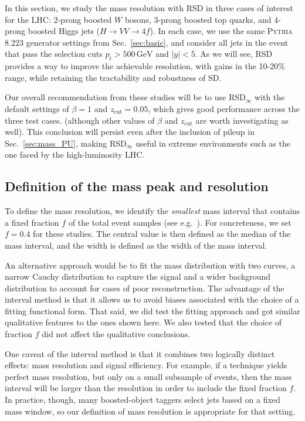 \documentclass[11pt,a4paper]{article}
\newcommand{\zcut}{z_\text{cut}}
\newcommand{\GeV}{\,\mathrm{GeV}}
\DeclareRobustCommand{\Sec}[1]{Sec.~\ref{#1}}
\begin{document}
In this section, we study the mass resolution with RSD in three cases
of interest for the LHC: 2-prong boosted $W$ bosons, 3-prong boosted
top quarks, and 4-prong boosted Higgs jets ($H\to VV\to 4f$).
%
In each case, we use the same \textsc{Pythia} 8.223 generator settings
from \Sec{sec:basic}, and consider all jets in the event
that pass the selection cuts $p_t>500 \GeV$ and $|y| < 5$.
%
As we will see, RSD provides a way to improve the achievable
resolution, with gains in the 10-20\% range, while retaining the
tractability and robustness of SD.

Our overall recommendation from these studies will be to use
RSD$_\infty$ with the default settings of $\beta = 1$ and
$\zcut =0.05$, which gives good performance across the three test
cases.  (although other values of $\beta$ and $\zcut$ are worth
investigating as well).
%
This conclusion will persist even after the inclusion of pileup in \Sec{sec:mass_PU}, making RSD$_{\infty}$ useful in extreme environments such as the one faced by the high-luminosity LHC.


\subsection{Definition of the mass peak and resolution}
\label{sec:bestfit}

To define the mass resolution, we identify the \emph{smallest} mass
interval that contains a fixed fraction $f$ of the total event
samples (see e.g.~\cite{Altheimer:2013yza}).
%
For concreteness, we set $f = 0.4$ for these studies.
%
The central value is then defined as the median of the mass interval, and the
width is defined as the width of the mass interval.

An alternative approach would be to fit the mass distribution with two curves, a narrow Cauchy distribution to capture the signal and a wider background distribution to account for cases of poor reconstruction.
%
The advantage of the interval method is that it allows us to avoid
biases associated with the choice of a fitting functional form.
%
That said, we did test the fitting approach and got similar qualitative features to the ones shown here.
%
We also tested that the choice of fraction $f$ did not affect the qualitative conclusions.

One
caveat of the interval method is that it combines two
logically distinct effects: mass resolution and signal efficiency.
%
For example, if a technique yields perfect mass resolution, but only on a small subsample of events, then the mass interval will be larger than the resolution in order to include the fixed fraction $f$.
%
In practice, though, many boosted-object taggers select jets based on a fixed mass window, so our definition of mass resolution is appropriate for that setting.
\end{document}
